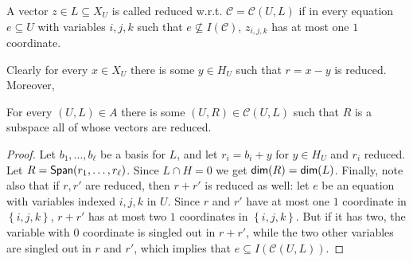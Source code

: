 \documentclass{toc}
\newcommand\set[1]{{\left\{ #1 \right\}}}
\newcommand\spn{{\sf Span}}
\newcommand*\dimm{{\sf dim}}
\renewcommand\dim{\dimm}
\renewcommand\subset{\subseteq}
\def\C{\mathcal{C}}
\begin{document}
\begin{definition}
  A vector $z\in L\subset X_U$ is called reduced w.r.t. $\C=\C(U,L)$
  if in every equation $e\subset U$ with variables $i,j,k$ such that $e\not\subset I(\C)$,
  $z_{i,j,k}$ has at most one $1$ coordinate.
\end{definition}
Clearly for every $x\in X_U$ there is some $y\in H_U$ such that $r=x-y$ is reduced. Moreover,
\begin{claim} For every $(U,L)\in A$ there is some $(U,R)\in \C(U,L)$ such that $R$ is a subspace all of whose vectors are reduced.
\end{claim}
\begin{proof}
Let $b_1,\ldots,b_\ell$ be a basis for $L$, and let $r_i = b_i + y$
for $y\in H_U$ and $r_i$ reduced. Let $R=
\spn(r_1,\ldots,r_\ell)$. Since $L\cap H = 0$ we get $\dimm( R) = \dim
(L)$. Finally, note also that if $r,r'$ are reduced, then $r+r'$ is
reduced as well: let $e$ be an equation with variables indexed $i,j,k$
in $U$. Since $r$ and $r'$ have at most one $1$ coordinate in
$\set{i,j,k}$, $r+r'$ has at most two $1$ coordinates in
$\set{i,j,k}$. But if  it has two, the variable with $0$ coordinate is
singled out in  $r+r'$, while the two other variables are singled out
in $r$ and $r'$, which implies that $e\subseteq I(\C(U,L))$.
\end{proof}
\end{document}
